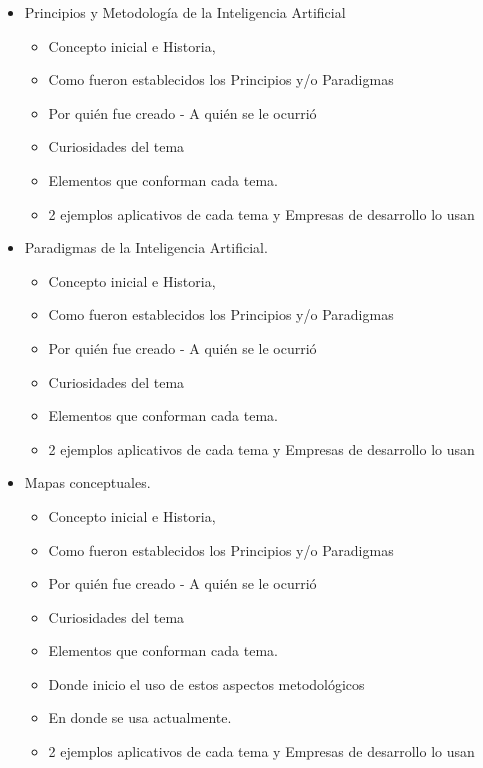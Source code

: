 \documentclass[12pt]{article}
\begin{document}
\begin{itemize}
    \item Principios y Metodología de la Inteligencia Artificial
    \begin{itemize}
    
    
   		\item Concepto inicial e Historia,
		\item Como fueron establecidos los Principios y/o Paradigmas
		\item Por quién fue creado - A quién se le ocurrió
		\item Curiosidades del tema
		\item Elementos que conforman cada tema.
		\item 2 ejemplos aplicativos de cada tema y Empresas de desarrollo lo usan
    
     
    \end{itemize}
    
    \item Paradigmas de la Inteligencia Artificial.
    \begin{itemize}
		\item Concepto inicial e Historia,
		\item Como fueron establecidos los Principios y/o Paradigmas
		\item Por quién fue creado - A quién se le ocurrió
		\item Curiosidades del tema
		\item Elementos que conforman cada tema.
		\item 2 ejemplos aplicativos de cada tema y Empresas de desarrollo lo usan
    \end{itemize}
    
    \item Mapas conceptuales.
		    \begin{itemize}
\item Concepto inicial e Historia,
\item Como fueron establecidos los Principios y/o Paradigmas
\item Por quién fue creado - A quién se le ocurrió
\item Curiosidades del tema
\item Elementos que conforman cada tema.
\item Donde inicio el uso de estos aspectos metodológicos
	\item En donde se usa actualmente.
\item 2 ejemplos aplicativos de cada tema y
Empresas de desarrollo lo usan
    \end{itemize}    
    

\end{itemize}
\end{document}
